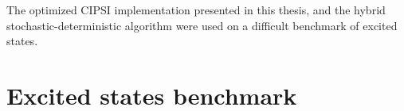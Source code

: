 \documentclass[./thesis.tex]{subfiles}
\begin{document}
\label{chap:applications}

The optimized CIPSI implementation presented in this thesis, and the hybrid
stochastic-deterministic algorithm were used on a difficult benchmark of excited
states.

\section{Excited states benchmark}
\end{document}
